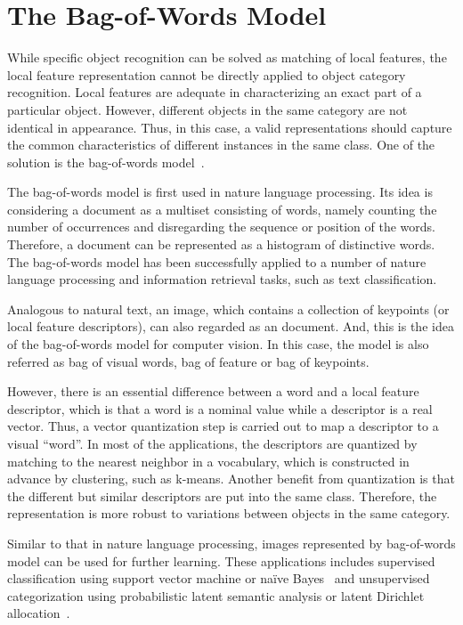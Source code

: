\documentclass[12pt,final,twoside]{report}
\begin{document}
\section{The Bag-of-Words Model}
While specific object recognition can be solved as matching of local features, the local feature representation cannot be directly applied to object category recognition. Local features are adequate in characterizing an exact part of a particular object. However, different objects in the same category are not identical in appearance. Thus, in this case, a valid representations should capture the common characteristics of different instances in the same class. One of the solution is the bag-of-words model~\cite{csurka_visual_2004}.

The bag-of-words model is first used in nature language processing. Its idea is considering a document as a multiset consisting of words, namely counting the number of occurrences and disregarding the sequence or position of the words. Therefore, a document can be represented as a histogram of distinctive words. The bag-of-words model has been successfully applied to a number of nature language processing and information retrieval tasks, such as text classification.

Analogous to natural text, an image, which contains a collection of keypoints (or local feature descriptors), can also regarded as an document. And, this is the idea of the bag-of-words model for computer vision. In this case, the model is also referred as bag of visual words, bag of feature or bag of keypoints. 

However, there is an essential difference between a word and a local feature descriptor, which is that a word is a nominal value while a descriptor is a real vector. Thus, a vector quantization step is carried out to map a descriptor to a visual ``word''. In most of the applications, the descriptors are quantized by matching to the nearest neighbor in a vocabulary, which is constructed in advance by clustering, such as k-means. Another benefit from quantization is that the different but similar descriptors are put into the same class. Therefore, the representation is more robust to variations between objects in the same category.

Similar to that in nature language processing, images represented by bag-of-words model can be used for further learning. These applications includes supervised classification using support vector machine or na\"ive Bayes~\cite{csurka_visual_2004} and unsupervised categorization using probabilistic latent semantic analysis or latent Dirichlet allocation~\cite{sivic_discovering_2005}.
\end{document}
